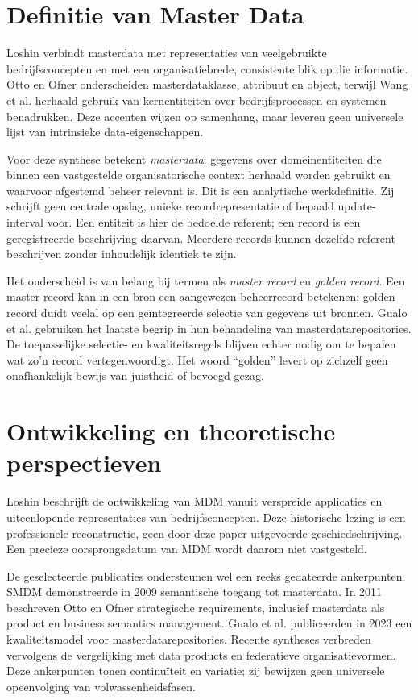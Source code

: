 \section{Definitie van Master Data}
Loshin verbindt masterdata met representaties van veelgebruikte bedrijfsconcepten en met een organisatiebrede, consistente blik op die informatie. Otto en Ofner onderscheiden masterdataklasse, attribuut en object, terwijl Wang et al. herhaald gebruik van kernentiteiten over bedrijfsprocessen en systemen benadrukken. Deze accenten wijzen op samenhang, maar leveren geen universele lijst van intrinsieke data-eigenschappen. \parencite{B01,L20,L18}

Voor deze synthese betekent \emph{masterdata}: gegevens over domeinentiteiten die binnen een vastgestelde organisatorische context herhaald worden gebruikt en waarvoor afgestemd beheer relevant is. Dit is een analytische werkdefinitie. Zij schrijft geen centrale opslag, unieke recordrepresentatie of bepaald update-interval voor. Een entiteit is hier de bedoelde referent; een record is een geregistreerde beschrijving daarvan. Meerdere records kunnen dezelfde referent beschrijven zonder inhoudelijk identiek te zijn.

Het onderscheid is van belang bij termen als \emph{master record} en \emph{golden record}. Een master record kan in een bron een aangewezen beheerrecord betekenen; golden record duidt veelal op een geïntegreerde selectie van gegevens uit bronnen. Gualo et al. gebruiken het laatste begrip in hun behandeling van masterdatarepositories. De toepasselijke selectie- en kwaliteitsregels blijven echter nodig om te bepalen wat zo'n record vertegenwoordigt. Het woord ``golden'' levert op zichzelf geen onafhankelijk bewijs van juistheid of bevoegd gezag. \parencite{L19,P01}

\section{Ontwikkeling en theoretische perspectieven}
Loshin beschrijft de ontwikkeling van MDM vanuit verspreide applicaties en uiteenlopende representaties van bedrijfsconcepten. Deze historische lezing is een professionele reconstructie, geen door deze paper uitgevoerde geschiedschrijving. Een precieze oorsprongsdatum van MDM wordt daarom niet vastgesteld. \parencite[§1.2]{B01}

De geselecteerde publicaties ondersteunen wel een reeks gedateerde ankerpunten. SMDM demonstreerde in 2009 semantische toegang tot masterdata. In 2011 beschreven Otto en Ofner strategische requirements, inclusief masterdata als product en business semantics management. Gualo et al. publiceerden in 2023 een kwaliteitsmodel voor masterdatarepositories. Recente syntheses verbreden vervolgens de vergelijking met data products en federatieve organisatievormen. Deze ankerpunten tonen continuïteit en variatie; zij bewijzen geen universele opeenvolging van volwassenheidsfasen. \parencite{L18,L20,L19,L12,L24}


